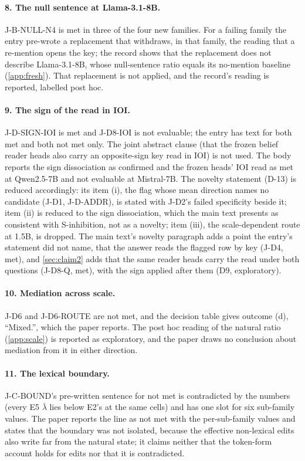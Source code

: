 \paragraph{8. The null sentence at Llama-3.1-8B.} J-B-NULL-N4 is met in three of the four new families. For a failing family the entry pre-wrote a replacement that withdraws, in that family, the reading that a re-mention opens the key; the record shows that the replacement does not describe Llama-3.1-8B, whose null-sentence ratio equals its no-mention baseline (\cref{app:fresh}). That replacement is not applied, and the record's reading is reported, labelled post hoc.

\paragraph{9. The sign of the read in IOI.} J-D-SIGN-IOI is met and J-D8-IOI is not evaluable; the entry has text for both met and both not met only. The joint abstract clause (that the frozen belief reader heads also carry an opposite-sign key read in IOI) is not used. The body reports the sign dissociation as confirmed and the frozen heads' IOI read as met at Qwen2.5-7B and not evaluable at Mistral-7B. The novelty statement (D-13) is reduced accordingly: its item (i), the flag whose mean direction names no candidate (J-D1, J-D-ADDR), is stated with J-D2's failed specificity beside it; item (ii) is reduced to the sign dissociation, which the main text presents as consistent with S-inhibition, not as a novelty; item (iii), the scale-dependent route at 1.5B, is dropped. The main text's novelty paragraph adds a point the entry's statement did not name, that the answer reads the flagged row by key (J-D4, met), and \cref{sec:claim2} adds that the same reader heads carry the read under both questions (J-D8-Q, met), with the sign applied after them (D9, exploratory).

\paragraph{10. Mediation across scale.} J-D6 and J-D6-ROUTE are not met, and the decision table gives outcome (d), ``Mixed.'', which the paper reports. The post hoc reading of the natural ratio (\cref{app:scale}) is reported as exploratory, and the paper draws no conclusion about mediation from it in either direction.

\paragraph{11. The lexical boundary.} J-C-BOUND's pre-written sentence for not met is contradicted by the numbers (every E5 $\bar\lambda$ lies below E2's at the same cells) and has one slot for six sub-family values. The paper reports the line as not met with the per-sub-family values and states that the boundary was not isolated, because the effective non-lexical edits also write far from the natural state; it claims neither that the token-form account holds for edits nor that it is contradicted. %


